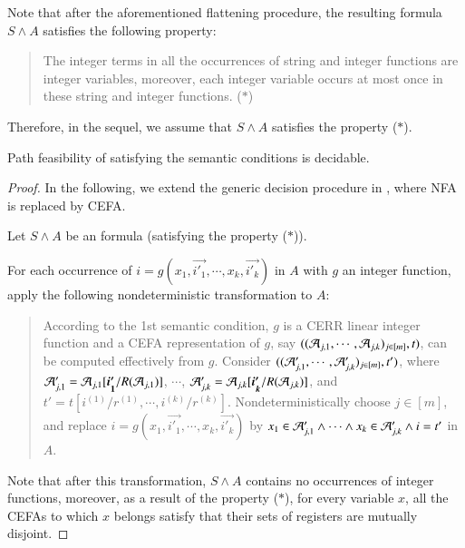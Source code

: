 Note that after the aforementioned flattening procedure, the resulting formula $S \wedge A$ satisfies the following property: 
\begin{quote}
The integer terms in all the occurrences of string and integer functions  are integer variables, moreover, each integer variable occurs at most once in these string and integer functions.  \hfill ($*$)
\end{quote}
Therefore, in the sequel, we assume that $S \wedge A$ satisfies the property ($*$).

\begin{theorem}\label{thm-sl-int-dec}
Path feasibility of {\slint} satisfying the semantic conditions is decidable.
\end{theorem}

\begin{proof}
In the following, we extend the generic decision procedure in \cite{CHL+18}, where NFA is replaced by CEFA.

Let $S \wedge A$ be an {\slint} formula (satisfying the property ($*$)).

For each occurrence of $i = g(x_1, \vec{i'_1}, \cdots, x_k, \vec{i'_k})$ in $A$ with $g$ an integer function, apply the following nondeterministic transformation to $A$: 
\begin{quote}
According to the 1st semantic condition, $g$ is a CERR linear integer function and a CEFA representation of $g$, say $((\mathcal{A}_{j,1}, \cdots, \mathcal{A}_{j, k})_{j \in [m]}, t)$, can be computed effectively from $g$. Consider $((\mathcal{A}'_{j,1}, \cdots, \mathcal{A}'_{j, k})_{j \in [m]}, t')$, where $\Aut'_{j,1}=\Aut_{j,1}[\vec{i'_1}/R(\Aut_{j,1})]$, $\cdots$, $\Aut'_{j,k}=\Aut_{j,k}[\vec{i'_k}/R(\Aut_{j,k})]$, and $t' = t[i^{(1)}/r^{(1)}, \cdots, i^{(k)}/r^{(k)}]$.
Nondeterministically choose $j \in [m]$, and replace $i = g(x_1, \vec{i'_1}, \cdots, x_k, \vec{i'_k})$ by $x_1 \in \mathcal{A}'_{j,1} \wedge \cdots \wedge x_k \in \mathcal{A}'_{j,k} \wedge i = t'$ in $A$.
\end{quote}
Note that after this transformation, $S \wedge A$ contains no occurrences of integer functions, moreover, as a result of the property ($*$), for every variable $x$, all the CEFAs to which $x$ belongs satisfy that their sets of registers are  mutually disjoint.


\end{proof}

